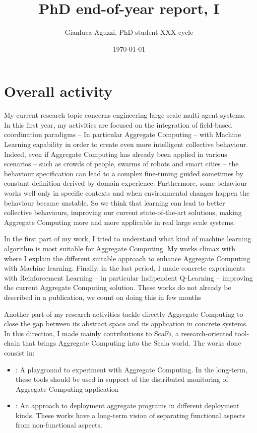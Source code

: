 \documentclass[12pt]{article}
\begin{document}
\title{PhD end-of-year report, I}
\author{Gianluca Aguzzi, PhD student XXX cycle}
\date{\today}
\maketitle

\section{Overall activity}
My current research topic concerns engineering large scale multi-agent systems.
 In this first year, my activities are focused on the integration of field-based coordination paradigms 
 -- In particular Aggregate Computing -- with Machine Learning capability 
 in order to create even more intelligent collective behaviour.
%
Indeed, even if Aggregate Computing has already been applied in various scenarios -- 
 such as crowds of people, swarms of robots and smart cities -- the behaviour specification can lead to
 a complex fine-tuning guided sometimes by constant definition derived by domain experience.
%
Furthermore, some behaviour works well only in specific contexts and when environmental
 changes happen the behaviour became unstable.
%
So we think that learning can lead to better collective behaviours, 
 improving our current state-of-the-art solutions, making Aggregate 
 Computing more and more applicable in real large scale systems.

In the first part of my work, I tried to understand what 
 kind of machine learning algorithm is most suitable for Aggregate Computing.
%
My works climax with \textit{} where I explain the different suitable approach
 to enhance Aggregate Computing with Machine learning.
%
Finally, in the last period, I made concrete experiments with 
 Reinforcement Learning -- in particular Indipendent Q-Learning -- improving the current Aggregate Computing solution. 
 These works do not already be described in a publication,
 we count on doing this in few months

Another part of my research activities tackle directly Aggregate Computing to close the gap between
 its abstract space and its application in concrete systems. 
%
In this direction, I made mainly contributions to ScaFi, 
 a research-oriented tool-chain that brings Aggregate Computing 
 into the Scala world. The works done consist in:

\begin{itemize}
  \item \textit{}: 
	 A playground to experiment with Aggregate Computing. In the long-term, these tools should be used in support of
  the distributed monitoring of Aggregate Computing application
  \item \textit{}: 
	 An approach to deployment aggregate programs in different deployment kinds. These works have a long-term vision of separating functional aspects from non-functional aspects.
\end{itemize}
\end{document}
